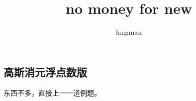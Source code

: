\documentclass[a4paper,13.6pt]{article}
\author{langman}
\title{no money for new}
\begin{document}
\begin{CJK}{UTF8}{gbsn}


\section{高斯消元浮点数版} 
东西不多，直接上一一道例题。
\inputminted{c++}{../../scoure/other/a.cpp}
\end{CJK}
\end{document}
